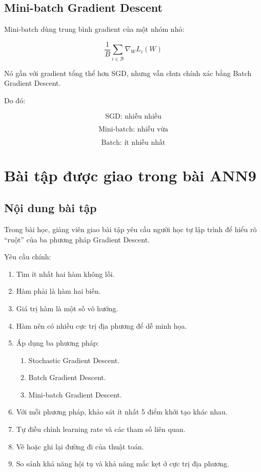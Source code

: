 \documentclass[12pt,a4paper]{report}
\begin{document}
\section{Mini-batch Gradient Descent}

Mini-batch dùng trung bình gradient của một nhóm nhỏ:

\[
    \frac{1}{B}
    \sum_{i\in \mathcal{B}}
    \nabla_W L_i(W)
\]

Nó gần với gradient tổng thể hơn SGD, nhưng vẫn chưa chính xác bằng Batch Gradient Descent.

Do đó:

\[
    \text{SGD: nhiễu nhiều}
\]

\[
    \text{Mini-batch: nhiễu vừa}
\]

\[
    \text{Batch: ít nhiễu nhất}
\]

\chapter{Bài tập được giao trong bài ANN9}

\section{Nội dung bài tập}

Trong bài học, giảng viên giao bài tập yêu cầu người học tự lập trình để hiểu rõ ``ruột'' của ba phương pháp Gradient Descent.

Yêu cầu chính:

\begin{enumerate}
    \item Tìm ít nhất hai hàm không lồi.
    \item Hàm phải là hàm hai biến.
    \item Giá trị hàm là một số vô hướng.
    \item Hàm nên có nhiều cực trị địa phương để dễ minh họa.
    \item Áp dụng ba phương pháp:
    \begin{enumerate}
        \item Stochastic Gradient Descent.
        \item Batch Gradient Descent.
        \item Mini-batch Gradient Descent.
    \end{enumerate}
    \item Với mỗi phương pháp, khảo sát ít nhất 5 điểm khởi tạo khác nhau.
    \item Tự điều chỉnh learning rate và các tham số liên quan.
    \item Vẽ hoặc ghi lại đường đi của thuật toán.
    \item So sánh khả năng hội tụ và khả năng mắc kẹt ở cực trị địa phương.
\end{enumerate}
\end{document}
